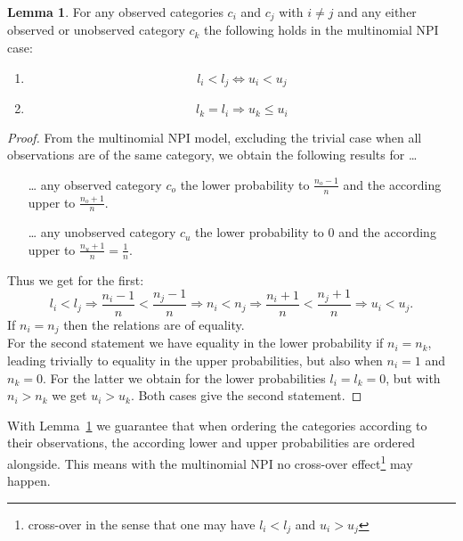\documentclass[a4paper]{article}
\theoremstyle{definition} \newtheorem{lemma}{Lemma}
\theoremstyle{remark} \newtheorem{remark}{Remark}
\begin{document}
\begin{lemma}
\label{lemmaNPI1}
For any observed categories $c_i$ and $c_j$ with $i \neq j$ and any either observed or unobserved category $c_k$ the following holds in the multinomial NPI case:
\begin{enumerate}
\item \begin{displaymath}
l_i < l_j \Longleftrightarrow u_i < u_j
\end{displaymath}
\item \begin{displaymath}
l_k = l_i \Longrightarrow u_k \leq u_i
\end{displaymath}
\end{enumerate}
\end{lemma}
\begin{proof}
From the multinomial NPI model, excluding the trivial case when all observations are of the same category, we obtain the following results for \ldots 
\begin{itemize}
\item[\ldots] any observed category $c_o$ the lower probability to $\frac{n_o-1}{n}$ and the according upper to $\frac{n_o+1}{n}$.
\item[\ldots] any unobserved category $c_u$ the lower probability to $0$ and the according upper to $\frac{n_u+1}{n} = \frac{1}{n}$.
\end{itemize}
Thus we get for the first:
\begin{displaymath}
l_i < l_j \Longrightarrow \frac{n_i-1}{n} < \frac{n_j-1}{n} \Longrightarrow n_i < n_j \Longrightarrow \frac{n_i+1}{n} < \frac{n_j+1}{n} \Longrightarrow u_i < u_j.
\end{displaymath}
If $n_i = n_j$ then the relations are of equality.\\[0.5em]
For the second statement we have equality in the lower probability if $n_i = n_k$, leading trivially to equality in the upper probabilities, but also when $n_i=1$ and $n_k=0$. For the latter we obtain for the lower probabilities $l_i = l_k=0$, but with $n_i > n_k$ we get $u_i> u_k$.
Both cases  give the second statement.
\end{proof}

With Lemma~\ref{lemmaNPI1} we guarantee that when ordering the categories according to their observations, the according lower and upper probabilities are ordered alongside. This means with the multinomial NPI no cross-over effect\footnote{cross-over in the sense that one may have $l_i<l_j$ and $u_i>u_j$} may happen.
\end{document}
